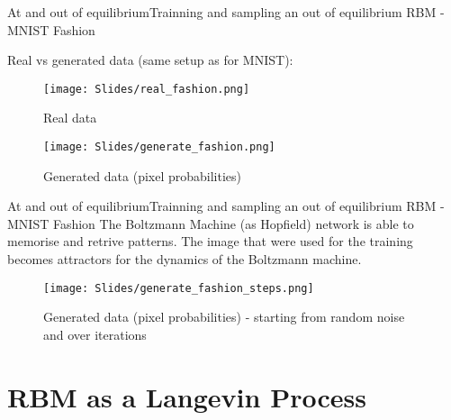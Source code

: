 \documentclass{beamer}
\begin{document}
\begin{frame}{At and out of equilibrium}{Trainning and sampling an out of equilibrium RBM - MNIST Fashion}

Real vs generated data (same setup as for MNIST):
    
\begin{figure}
\centering
\begin{minipage}{.5\textwidth}
  \centering
  \texttt{[image: Slides/real\_fashion.png]}
  \caption{Real data\vspace*{1em}}
  \label{fig:test1}
\end{minipage}%
\begin{minipage}{.5\textwidth}
  \texttt{[image: Slides/generate\_fashion.png]}
  \caption{Generated data (pixel probabilities)}
  \label{fig:test2}
\end{minipage}
\end{figure}

\end{frame}


\begin{frame}{At and out of equilibrium}{Trainning and sampling an out of equilibrium RBM - MNIST Fashion}
The Boltzmann Machine (as Hopfield) network is able to memorise and retrive patterns.
The image that were used for the training becomes attractors for the dynamics of the Boltzmann machine.

\begin{figure}
  \texttt{[image: Slides/generate\_fashion\_steps.png]}
  \caption{Generated data (pixel probabilities) - starting from random noise and over iterations}
  \label{fig:test2}
\end{figure}

\end{frame}

\section{RBM as a Langevin Process}
\end{document}
